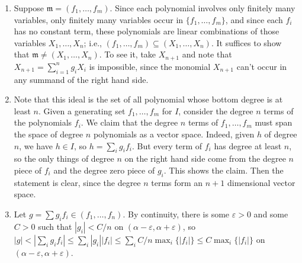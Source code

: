 \documentclass[12pt]{amsart}
\newcommand{\m}{\mathfrak{m}}
\newcommand{\solution}[1]{\ifthenelse {\equal{\displaysol}{1}} {\begin{framed}{\color{meretale}\noindent #1}\end{framed}} { \ }}
\newcommand\itemb{\stepcounter{enumii}\item[(\theenumii)]}
\begin{document}
\begin{enumerate}
\solution{\begin{enumerate}

\itemb Suppose $\m=(f_1,\dots,f_m)$. Since each polynomial involves only finitely many variables, only finitely many variables occur in $\{f_1,\dots,f_m\}$, and since each $f_i$ has no constant term, these polynomials are linear combinations of those variables $X_1,\dots,X_n$; i.e., $(f_1,\dots,f_m) \subseteq (X_1,\dots,X_n)$. It suffices to show that $\m \neq (X_1,\dots,X_n)$. To see it, take $X_{n+1}$ and note that $X_{ n+1}= \sum_{i=1}^n g_i X_i$ is impossible, since the monomial $X_{n+1}$ can't occur in any summand of the right hand side.

\item Note that this ideal is the set of all polynomial whose bottom degree is at least $n$. Given a generating set $f_1,\dots,f_m$ for $I$, consider the degree $n$ terms of the polynomials $f_i$. We claim that the degree $n$ terms of $f_1,\dots,f_m$ must span the space of degree $n$ polynomials as a vector space. Indeed, given $h$ of degree $n$, we have $h\in I$, so $h=\sum_i g_i f_i$. But every term of $f_i$ has degree at least $n$, so the only things of degree $n$ on the right hand side come from the degree $n$ piece of $f_i$ and the degree zero piece of $g_i$. This shows the claim. Then the statement is clear, since the degree $n$ terms form an $n+1$ dimensional vector space.

\itemb Let $g=\sum g_i f_i \in (f_1,\dots,f_n)$. By continuity, there is some $\varepsilon>0$ and some $C>0$ such that $|g_i| < C/n$ on $(\alpha-\varepsilon,\alpha+\varepsilon)$, so $|g| < |\sum_i g_i f_i | \leq \sum_i |g_i| |f_i| \leq \sum_i C/n \max_i\{|f_i|\} \leq C \max_i\{|f_i|\}$ on $(\alpha-\varepsilon,\alpha+\varepsilon)$. 


\end{enumerate}}
\end{enumerate}
\end{document}
